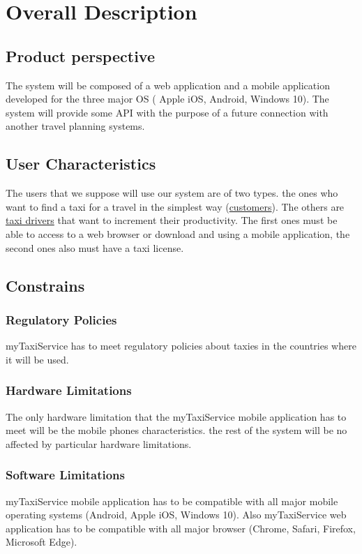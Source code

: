 \documentclass{report}
\begin{document}
\chapter{Overall Description}
	
	\section{Product perspective}
	The system will be composed of a web application and a mobile application developed for the three major OS ( Apple iOS, Android, Windows 10). The system will provide some API with the purpose of a future connection with another travel planning systems. 
		
	\section{User Characteristics}
	The users that we suppose will use our system are of two types. the ones who want to find a taxi for a travel in the simplest way (\hyperref[sec:customer]{customers}). The others are \hyperref[sec:tdriver]{taxi drivers} that want to increment their productivity. The first ones must be able to access to a web browser or download and using a mobile application, the second ones also must have a taxi license.
		
	\section{Constrains}
		
		\subsection{Regulatory Policies}
		myTaxiService  has to meet regulatory policies about taxies in the countries where it will be used.

		\subsection{Hardware Limitations}
		The only hardware limitation that the myTaxiService mobile application has to meet will be the mobile phones characteristics. the rest of the system will be no affected by particular hardware limitations.

		\subsection{Software Limitations}
		myTaxiService mobile application has to be compatible with all major mobile operating systems (Android, Apple iOS, Windows 10).
		Also myTaxiService web application has to be compatible with all major browser (Chrome, Safari, Firefox, Microsoft Edge).
\end{document}
